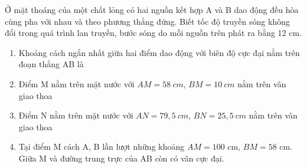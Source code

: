 \begin{vidu}
Ở mặt thoáng của một chất lỏng có hai nguồn kết hợp A và B dao động đều hòa cùng pha với nhau và theo phương thẳng đứng. Biết tốc độ truyền sóng không đổi trong quá trình lan truyền, bước sóng do mỗi nguồn trên phát ra bằng 12 cm. 
\begin{enumerate}
\item Khoảng cách ngắn nhất giữa hai điểm dao động với biên độ cực đại nằm trên đoạn thẳng AB là \dotfill
\item Điểm M nằm trên mặt nước với $AM = 58\ cm$, $BM = 10\ cm$ nằm trên vân giao thoa \dotfill
\item Điểm N nằm trên mặt nước với $AN = 79,5\ cm$, $BN = 25,5\ cm$ nằm trên vân giao thoa \dotfill
\item Tại điểm M cách A, B lần lượt những khoảng $AM=100$ cm, $BM=58$ cm. Giữa M và đường trung trực của AB còn có \dotfill vân cực đại.
\end{enumerate}
\end{vidu} %


